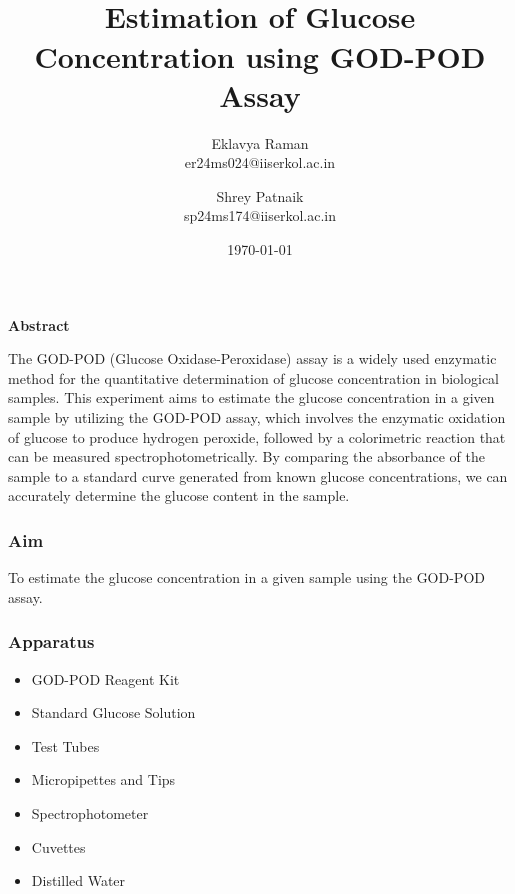\documentclass[openany]{book}
\begin{document}
\title{\Large{} \\ \vspace{5pt}
\large{Estimation of Glucose Concentration using GOD-POD Assay}}
\author{Eklavya Raman \\ \vspace{5pt} er24ms024@iiserkol.ac.in \\ \vspace{5pt} \and Shrey Patnaik \\ \vspace{5pt} sp24ms174@iiserkol.ac.in}
\date{\today}
\maketitle
\begin{center}
    \textbf{Abstract}

\end{center}
    The GOD-POD (Glucose Oxidase-Peroxidase) assay is a widely used enzymatic method for the quantitative determination of glucose concentration in biological samples. This experiment aims to estimate the glucose concentration in a given sample by utilizing the GOD-POD assay, which involves the enzymatic oxidation of glucose to produce hydrogen peroxide, followed by a colorimetric reaction that can be measured spectrophotometrically. By comparing the absorbance of the sample to a standard curve generated from known glucose concentrations, we can accurately determine the glucose content in the sample.

\subsubsection{Aim}
To estimate the glucose concentration in a given sample using the GOD-POD assay.
\subsubsection{Apparatus}
\begin{itemize}
    \item GOD-POD Reagent Kit
    \item Standard Glucose Solution
    \item Test Tubes
    \item Micropipettes and Tips
    \item Spectrophotometer
    \item Cuvettes
    \item Distilled Water
\end{itemize}
\end{document}
